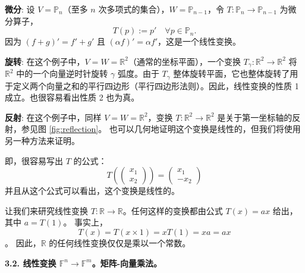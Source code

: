 \begin{example}
\textbf{微分}: 设 $V = \mathbb{P}_n$（至多 $n$ 次多项式的集合），$W = \mathbb{P}_{n-1}$，令 $T : \mathbb{P}_n \to \mathbb{P}_{n-1}$ 为微分算子，
$$ T(p) := p' \quad \forall p \in \mathbb{P}_n. $$
因为 $(f+g)' = f' + g'$ 且 $(\alpha f)' = \alpha f'$，这是一个线性变换。
\end{example}

\begin{example}
\textbf{旋转}: 在这个例子中，$V = W = \mathbb{R}^2$（通常的坐标平面），一个变换 $T_\gamma : \mathbb{R}^2 \to \mathbb{R}^2$ 将 $\mathbb{R}^2$ 中的一个向量逆时针旋转 $\gamma$ 弧度。由于 $T_\gamma$ 整体旋转平面，它也整体旋转了用于定义两个向量之和的平行四边形（平行四边形法则）。因此，线性变换的性质 1 成立。也很容易看出性质 2 也为真。
\end{example}



\begin{example}
\textbf{反射}: 在这个例子中，同样 $V = W = \mathbb{R}^2$，变换 $T : \mathbb{R}^2 \to \mathbb{R}^2$ 是关于第一坐标轴的反射，参见图 \ref{fig:reflection}。
也可以几何地证明这个变换是线性的，但我们将使用另一种方法来证明。

即，很容易写出 $T$ 的公式：
$$ T\left(\begin{pmatrix} x_1 \\ x_2 \end{pmatrix}\right) = \begin{pmatrix} x_1 \\ -x_2 \end{pmatrix} $$
并且从这个公式可以看出，这个变换是线性的。
\end{example}


\begin{example}
让我们来研究线性变换 $T : \mathbb{R} \to \mathbb{R}$。任何这样的变换都由公式 $T(x) = ax$ 给出，其中 $a = T(1)$。
事实上，$$T(x) = T(x \times 1) = x T(1) = xa = ax$$。
因此，$\mathbb{R}$ 的任何线性变换仅仅是乘以一个常数。
\end{example}




\textbf{3.2. 线性变换 $\mathbb{F}^n \to \mathbb{F}^m$。矩阵-向量乘法。}

